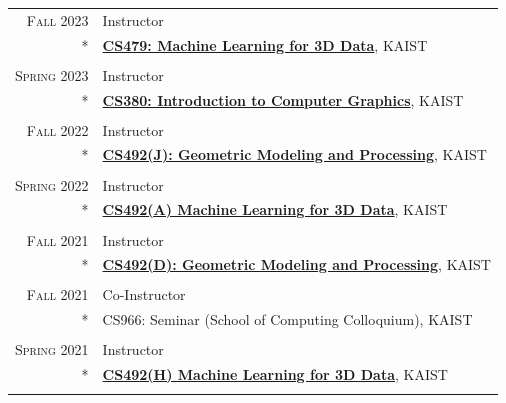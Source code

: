 \documentclass[letterpaper,10pt]{article} %
\begin{document}
\begin{longtable}{r|p{11cm}}
\textsc{Fall 2023} & Instructor\\*
& \href{https://mhsung.github.io/kaist-cs479-fall-2023/}{\textbf{CS479: Machine Learning for 3D Data}}, KAIST\\
& \\


\textsc{Spring 2023} & Instructor\\*
& \href{https://mhsung.github.io/kaist-cs380-spring-2023/}{\textbf{CS380: Introduction to Computer Graphics}}, KAIST\\
& \\


\textsc{Fall 2022} & Instructor\\*
& \href{https://mhsung.github.io/kaist-cs492j-fall-2022/}{\textbf{CS492(J): Geometric Modeling and Processing}}, KAIST\\
& \\


\textsc{Spring 2022} & Instructor\\*
& \href{https://mhsung.github.io/kaist-cs492a-spring-2022/}{\textbf{CS492(A) Machine Learning for 3D Data}}, KAIST\\
& \\


\textsc{Fall 2021} & Instructor\\*
& \href{https://mhsung.github.io/kaist-cs492d-fall-2021/}{\textbf{CS492(D): Geometric Modeling and Processing}}, KAIST\\
& \\


\textsc{Fall 2021} & Co-Instructor\\*
& CS966: Seminar (School of Computing Colloquium), KAIST\\
& \\

\textsc{Spring 2021} & Instructor\\*
& \href{https://mhsung.github.io/courses/kaist-cs492h-spring-2021/}{\textbf{CS492(H) Machine Learning for 3D Data}}, KAIST\\
& \\


\end{longtable}
\end{document}
